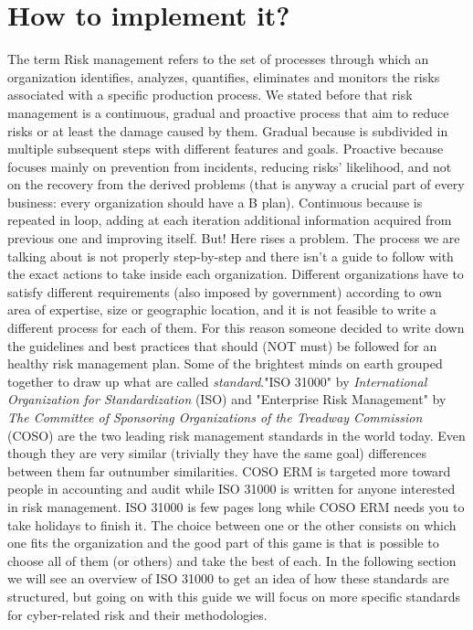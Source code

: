 \section{How to implement it?}
The term Risk management refers to the set of processes through which an organization identifies, analyzes, quantifies, eliminates and monitors the risks associated with a specific production process. We stated before that risk management is a continuous, gradual and proactive process that aim to reduce risks or at least the damage caused by them. Gradual because is subdivided in multiple subsequent steps with different features and goals. Proactive because focuses mainly on prevention from incidents, reducing risks' likelihood, and not on the recovery from the derived problems (that is anyway a crucial part of every business: every organization should have a B plan). Continuous because is repeated in loop, adding at each iteration additional information acquired from previous one and improving itself. But! Here rises a problem. The process we are talking about is not properly step-by-step and there isn't a guide to follow with the exact actions to take inside each organization. Different organizations have to satisfy different requirements (also imposed by government) according to own area of expertise, size or geographic location, and it is not feasible to write a different process for each of them. For this reason someone decided to write down the guidelines and best practices that should (NOT must) be followed for an healthy risk management plan. Some of the brightest minds on earth grouped together to draw up what are called \textit{standard}."ISO 31000" by \textit{International Organization for Standardization} (ISO) and "Enterprise Risk Management" by \textit{The Committee of Sponsoring Organizations of the Treadway Commission} (COSO) are the two leading risk management standards in the world today. Even though they are very similar (trivially they have the same goal) differences between them far outnumber similarities. COSO ERM is targeted more toward people in accounting and audit while ISO 31000 is written for anyone interested in risk management. ISO 31000 is few pages long while COSO ERM needs you to take holidays to finish it. The choice between one or the other consists on which one fits the organization and the good part of this game is that is possible to choose all of them (or others) and take the best of each. In the following section we will see an overview of ISO 31000 to get an idea of how these standards are structured, but going on with this guide we will focus on more specific standards for cyber-related risk and their methodologies.

